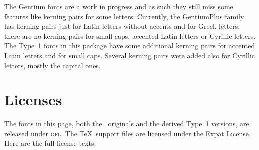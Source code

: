 \documentclass[12pt, english]{article}
\begin{document}
The Gentium fonts are a work in progress and as such they still miss
some features like kerning pairs for some letters. Currently,
the GentiumPlus
family has kerning pairs just for Latin letters without accents and for
Greek letters; there are no kerning pairs for small caps, accented Latin
letters or Cyrillic letters. The Type~1 fonts in this package have some
additional kerning pairs for accented Latin letters and for small
caps. Several kerning pairs were added also for Cyrillic letters, mostly
the capital ones.


\section{Licenses}

The fonts in this page, both the \sil\ originals and the derived Type~1
versions, are released under \textsc{ofl}.  The \TeX\ support files
are licensed under the Expat License.  Here are the full license texts.
\end{document}
